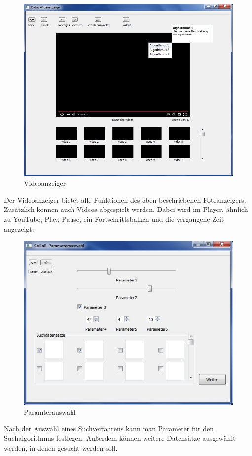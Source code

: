 \begin{figure}[H]
\includegraphics[width=1\linewidth]{img/Videoanzeiger}
\caption{Videoanzeiger}
\label{fig:videoanzeiger}
\end{figure}
Der Videoanzeiger bietet alle Funktionen des oben beschriebenen Fotoanzeigers. Zusätzlich können auch Videos abgespielt werden. Dabei wird im Player, ähnlich zu YouTube, Play, Pause, ein Fortschrittsbalken und die vergangene Zeit angezeigt. 

\begin{figure}[H]
\includegraphics[width=1\linewidth]{img/Parameterauswahl}
\caption{Paramterauswahl}
\label{fig:parameterauswahl}
\end{figure}
Nach der Auswahl eines Suchverfahrens kann man Parameter für den Suchalgorithmus festlegen. Außerdem können weitere Datensätze ausgewählt werden, in denen gesucht werden soll.

